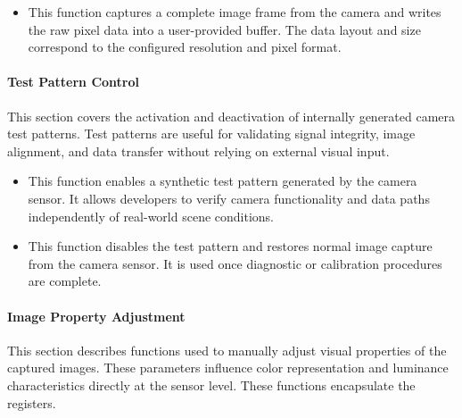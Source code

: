 \begin{itemize}
	\item {} 
	
	This function captures a complete image frame from the camera and writes the raw pixel data into a user-provided buffer. The data layout and size correspond to the configured resolution and pixel format.
\end{itemize}


\paragraph{Test Pattern Control}
This section covers the activation and deactivation of internally generated camera test patterns. Test patterns are useful for validating signal integrity, image alignment, and data transfer without relying on external visual input.

\begin{itemize}
	\item {} 
	
	This function enables a synthetic test pattern generated by the camera sensor. It allows developers to verify camera functionality and data paths independently of real-world scene conditions.
	
	\item {} 
	
	This function disables the test pattern and restores normal image capture from the camera sensor. It is used once diagnostic or calibration procedures are complete.
\end{itemize}



\paragraph{Image Property Adjustment}
This section describes functions used to manually adjust visual properties of the captured images. These parameters influence color representation and luminance characteristics directly at the sensor level. These functions encapsulate the registers. 

